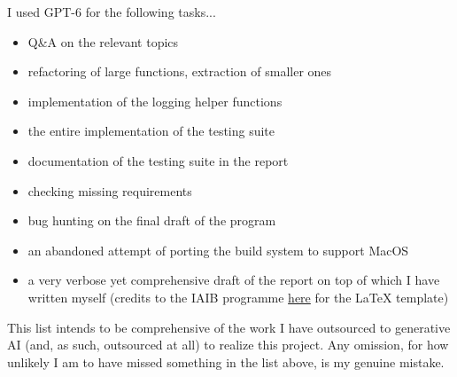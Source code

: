 I used GPT-6 for the following tasks...

\begin{itemize}
    \item Q\&A on the relevant topics
    \item refactoring of large functions, extraction of smaller ones
    \item implementation of the logging helper functions
    \item the entire implementation of the testing suite
    \item documentation of the testing suite in the report
    \item checking missing requirements
    \item bug hunting on the final draft of the program
    \item an abandoned attempt of porting the build system to support MacOS
    \item a very verbose yet comprehensive draft of the report on top
            of which I have written myself (credits to the IAIB programme 
            \href{https://gitlab.cs.taltech.ee/iaib/thesis-tex-estonian}{here}
            for the LaTeX template)
\end{itemize}

This list intends to be comprehensive of the work I have outsourced to generative AI
(and, as such, outsourced at all) to realize this project. Any omission, for how
unlikely I am to have missed something in the list above, is my genuine mistake.
